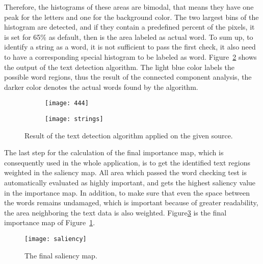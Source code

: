 \documentclass[draft,final]{vutinfth} %
\begin{document}
	Therefore, the histograms of these areas are bimodal, that means they have one peak for the letters and one for the background color. 
	The two largest bins of the histogram are detected, and if they contain a predefined percent of the pixels, it is set for 65\% as default, then is the area labeled as actual word.
	To sum up, to identify a string as a word, it is not sufficient to pass the first check, it  also need  to have a corresponding special histogram to be labeled as word. 
	Figure~\ref{fig:strings} shows the output of the text detection algorithm. 
	The light blue color labels the possible word regions, thus the result of the connected component analysis, the darker color denotes the actual words found by the algorithm.\par 
	\begin{figure}
		\centering
		\begin{subfigure}[b]{0.45\columnwidth}
			\centering
			\texttt{[image: 444]}
			\label{fig:strings:org}
		\end{subfigure}
		\begin{subfigure}[b]{0.45\columnwidth}
			\centering
			\texttt{[image: strings]}
		\end{subfigure}
		\caption{Result of the text detection algorithm applied on the given source.}
		\label{fig:strings} %
	\end{figure}
	The last step for the calculation of the final importance map, which is consequently used in the whole application, is to get the identified text regions weighted in the saliency map. 
	All area which passed the word checking test is automatically evaluated as highly important, and gets the highest saliency value in the importance map.
	In addition, to make sure that even the space between the words remains undamaged, which is important because of greater readability, the area neighboring the text data is also weighted.
	Figure\ref{fig:saliency} is the final importance map of Figure~\ref{fig:strings:org}.
	\begin{figure}[h]
		\centering		
		\texttt{[image: saliency]}
		\caption{The final saliency map.}
		\label{fig:saliency}
	\end{figure}
	
\end{document}
